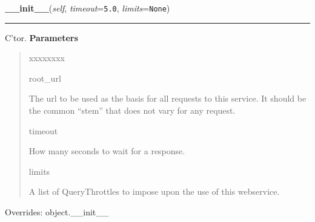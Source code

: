 \hspace{.8\funcindent}\begin{boxedminipage}{\funcwidth}

    \raggedright \textbf{\_\_init\_\_}(\textit{self}, \textit{timeout}={\tt 5.0}, \textit{limits}={\tt None})

    \vspace{-1.5ex}

    \rule{\textwidth}{0.5\fboxrule}
\setlength{\parskip}{2ex}

C'tor.
\setlength{\parskip}{1ex}
      \textbf{Parameters}
      \vspace{-1ex}

      \begin{quote}
        \begin{Ventry}{xxxxxxxx}

          \item[root\_url]


The url to be used as the basis for all requests to this service.
It should be the common ``stem'' that does not vary for any request.
          \item[timeout]


How many seconds to wait for a response.
          \item[limits]


A list of QueryThrottles to impose upon the use of this webservice.
        \end{Ventry}

      \end{quote}

      Overrides: object.\_\_init\_\_

    \end{boxedminipage}

    \label{biblio:webquery:xisbn:XisbnQuery:query_service}

    \vspace{0.5ex}

